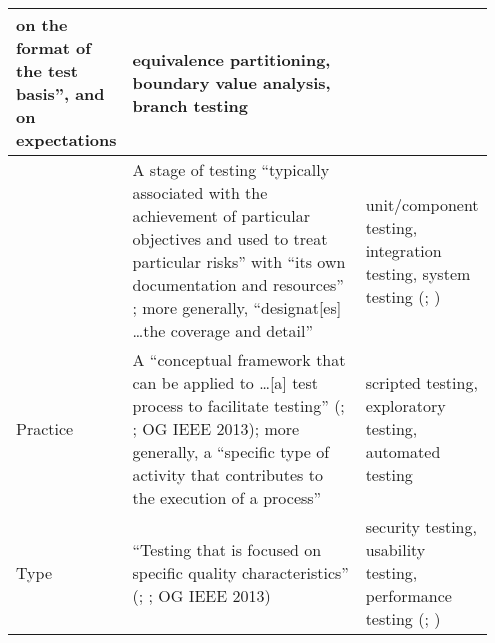 \begin{table}[hbtp!]
\begin{minipage}{\linewidth}
\begin{tabular}{|>{\centering}m{0.08\linewidth}m{0.6\linewidth}m{0.27\linewidth}|}
            on the format of the test basis'', and on expectations
            \citeyearpar[p.~23]{IEEE2022}           & equivalence partitioning,
            boundary value analysis, branch testing \citep[p.~11]{IEEE2022}                                      \\
            \hline
            \levelCell{}                            & A stage of testing
            ``typically associated with the achievement of particular objectives
            and used to treat particular risks'' \citep[p.~12]{IEEE2022} with
            ``its own documentation and resources'' \citeyearpar[p.~469]{IEEE2017}; more
            generally, ``designat[es] \dots the coverage and detail''
            \citeyearpar[p.~249]{IEEE2017}          & unit/component testing,
            integration testing, system testing (\citealp[p.~12]{IEEE2022};
            \citeyear[p.~467]{IEEE2017})                                                                         \\
            \hline
            Practice                                & A ``conceptual framework
            that can be applied to \dots [a] test process to facilitate testing''
            (\citealp[p.~14]{IEEE2022}; \citeyear[p.~471]{IEEE2017}; OG IEEE 2013);
            more generally, a ``specific type of activity
            that contributes to the execution of a process''
            \citeyearpar[p.~331]{IEEE2017}          & scripted testing,
            exploratory testing, automated testing \citep[p.~20]{IEEE2022}                                       \\
            \hline
            Type                                    & ``Testing that is focused
            on specific quality characteristics''
            (\citealp[p.~15]{IEEE2022}; \citeyear[p.~473]{IEEE2017};
            OG IEEE 2013)                           & security testing, usability testing,
            performance testing (\citealp[p.~15]{IEEE2022};
            \citeyear[p.~473]{IEEE2017})                                                                         \\
            \hline
        \end{tabular}
    \end{minipage}
\end{table}
